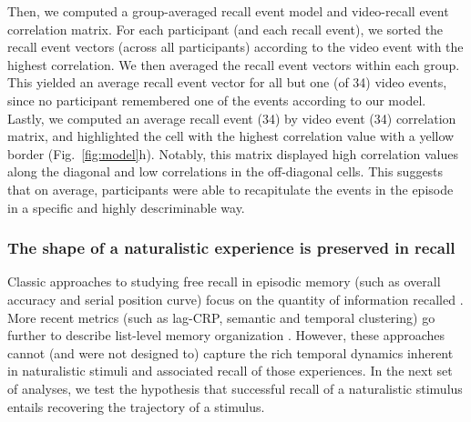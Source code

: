 \documentclass{article}
\begin{document}
{Then, we computed a group-averaged recall event model and video-recall event correlation matrix. For each participant (and each recall event), we sorted the recall event vectors (across all participants) according to the video event with the highest correlation. We then averaged the recall event vectors within each group. This yielded an average recall event vector for all but one (of 34) video events, since no participant remembered one of the events according to our model. Lastly, we computed an average recall event (34) by video event (34) correlation matrix, and highlighted the cell with the highest correlation value with a yellow border (Fig.~\ref{fig:model}h). Notably, this matrix displayed high correlation values along the diagonal and low correlations in the off-diagonal cells. This suggests that on average, participants were able to recapitulate the events in the episode in a specific and highly descriminable way.

\subsubsection{The shape of a naturalistic experience is preserved in recall}
Classic approaches to studying free recall in episodic memory (such as overall accuracy and serial position curve) focus on the quantity of information recalled \citep{Murd62a}. More recent metrics (such as lag-CRP, semantic and temporal clustering) go further to describe list-level memory organization \citep{Kaha96, PolyEtal09}. However, these approaches cannot (and were not designed to) capture the rich temporal dynamics inherent in naturalistic stimuli and associated recall of those experiences. In the next set of analyses, we test the hypothesis that successful recall of a naturalistic stimulus entails recovering the trajectory of a stimulus.

}
\end{document}

